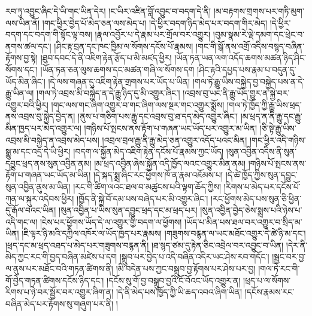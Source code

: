 རབ་ཏུ་འབྱུང་ཞིང་དེ་ཡི་གང་ཡིན་དེར། །ང་ཡིར་འཛིན་བློ་འབྱུང་བ་བདག་དེ་ནི། །མ་བརྟགས་གྲགས་པར་གཏི་མུག་ལས་ཡིན་ནོ། །གང་ཕྱིར་བྱེད་པོ་མེད་ཅན་ལས་མེད་པ། །དེ་ཕྱིར་བདག་ཉིད་མེད་པར་བདག་གིར་མེད། །དེ་ཕྱིར་བདག་དང་བདག་གི་སྟོང་ལྟ་བས། །རྣལ་འབྱོར་པ་དེ་རྣམ་པར་གྲོལ་བར་འགྱུར། །བུམ་སྣམ་རེ་ལྡེ་དམག་དང་ཕྲེང་བ་ནགས་ཚལ་དང་། །ཤིང་རྟ་བྲན་དང་ཁང་ཁྱིམ་ལ་སོགས་དངོས་པོ་རྣམས། །གང་གི་སྒོ་ནས་འགྲོ་འདིས་བསྙད་བཞིན་རྟོགས་བྱ་སྟེ། །ཐུབ་དབང་དེ་ནི་འཇིག་རྟེན་རྩོད་པ་མི་མཛད་ཕྱིར། །ཡོན་ཏན་ཡན་ལག་འདོད་ཆགས་མཚན་ཉིད་ཤིང་སོགས་དང་། །ཡོན་ཏན་ཅན་ལུས་ཆགས་དང་མཚན་གཞི་ལ་སོགས་དག །ཤིང་རྟའི་དཔྱད་པས་རྣམ་པ་བདུན་དུ་ཡོད་མིན་ཞིང་། །དེ་ལས་གཞན་དུ་འཇིག་རྟེན་གྲགས་པར་ཡོད་པ་ཡིན། །གལ་ཏེ་རྒྱུ་ཡིས་བསྐྱེད་བྱ་བསྐྱེད་པས་ན་དེ་རྒྱུ་ཡིན་ལ། །གལ་ཏེ་འབྲས་མི་བསྐྱེད་ན་དེ་རྒྱུ་ཉིད་དུ་མི་འགྱུར་ཞིང་། །འབྲས་བུ་ཡང་ནི་རྒྱུ་ཡོད་གྱུར་ན་སྐྱེ་བར་འགྱུར་བའི་ཕྱིར། །གང་ལས་གང་ཞིག་འགྱུར་བ་གང་ཞིག་ལས་སྔར་གང་འགྱུར་སྨྲོས། །གལ་ཏེ་ཁྱོད་ཀྱི་རྒྱུ་ཡིས་ཕྲད་ནས་འབྲས་བུ་སྐྱེད་བྱེད་ན། །ནུས་པ་གཅིག་པས་རྒྱུ་དང་འབྲས་བུ་ཐ་དད་མེད་འགྱུར་ཞིང་། །མ་ཕྲད་ན་ནི་རྒྱུ་དང་རྒྱུ་མིན་ཁྱད་པར་མེད་འགྱུར་ལ། །གཉིས་པོ་སྤངས་ནས་རྟོག་པ་གཞན་ཡང་ཡོད་པར་འགྱུར་མ་ཡིན། །ཅི་སྟེ་རྒྱུ་ཡིས་འབྲས་མི་བསྐྱེད་ན་འབྲས་མེད་པས། །འབྲལ་བྲལ་རྒྱུ་ནི་རྒྱུ་མེད་ཅན་འགྱུར་འདོད་པའང་མིན། །གང་ཕྱིར་འདི་གཉིས་སྒྱུ་མ་དང་འདྲ་དེ་ཡི་ཕྱིར། །བདག་ལ་སྐྱོན་མེད་འཇིག་རྟེན་དངོས་པོ་རྣམས་ཀྱང་ཡོད། །སུན་འབྱིན་འདིས་ནི་སུན་དབྱུང་ཕྲད་ནས་སུན་འབྱིན་ནམ། །མ་ཕྲད་འབྱིན་ཞེས་སྐྱོན་འདི་ཁྱོད་ལའང་འགྱུར་མིན་ནམ། །གཉིས་པོ་སྤངས་ནས་རྟོག་པ་གཞན་ཡང་ཡོད་མ་ཡིན། །དེ་སྐད་སྨྲ་ཞིང་རང་ཕྱོགས་ཁོ་ན་རྣམ་འཇོམས་པ། །དེ་ཚེ་ཁྱོད་ཀྱིས་སུན་དབྱུང་སུན་འབྱིན་ནུས་མ་ཡིན། །རང་གི་ཚིག་ལའང་ཐལ་བ་མཚུངས་པའི་ལྟག་ཆོད་ཀྱིས། །རིགས་པ་མེད་པར་དངོས་པོ་ཀུན་ལ་སྐུར་འདེབས་ཕྱིར། །ཁྱོད་ནི་སྐྱེ་བོ་དམ་པས་བཞེད་པར་མི་འགྱུར་ཞིང་། །རང་ཕྱོགས་མེད་པས་སུན་ཅི་ཕྱིན་དུ་རྒོལ་བའང་ཡིན། །སུན་འབྱིན་པ་ཡིས་སུན་དབྱུང་ཕྲད་དང་མ་ཕྲད་པར། །སུན་འབྱིན་བྱེད་ཅེས་སྨྲས་པའི་ཉེས་པ་འདི་གང་ལ། །ངེས་པར་ཕྱོགས་ཡོད་དེ་ལ་འགྱུར་གྱི་བདག་ལ་ཕྱོགས། །ཡོད་པ་མིན་པས་ཐལ་བར་འགྱུར་བ་སྲིད་མ་ཡིན། །ཇི་ལྟར་ཉི་མའི་དཀྱིལ་འཁོར་ལ་ཡོད་ཁྱད་པར་རྣམས། །གཟུགས་བརྙན་ལ་ཡང་མཐོང་འགྱུར་དེ་ཚེ་ཉི་མ་དང་། །ཕྲད་དང་མ་ཕྲད་འཐད་པ་མེད་པར་གཟུགས་བརྙན་ནི། །ཐ་སྙད་ཙམ་དུ་རྟེན་ཅིང་འབྲེལ་བར་འབྱུང་བ་ཡིན། །དེར་ནི་མེད་ཀྱང་རང་གི་བྱད་བཞིན་མཛེས་པ་དག །སྒྲུབ་པར་བྱེད་པ་འདི་བཞིན་འདིར་ཡང་ཤེས་རབ་གདོང་། །སྦྱང་བར་བྱ་ལ་ནུས་པར་མཐོང་བའི་གཏན་ཚིགས་ནི། །མི་བདེན་པས་ཀྱང་བསྒྲུབ་བྱ་རྟོགས་པར་ཤེས་པར་བྱ། །གལ་ཏེ་རང་གི་གོ་བྱེད་གཏན་ཚིགས་དངོས་ཉིད་དང་། །དངོས་སུ་གོ་བྱ་བསྒྲུབ་བྱའི་ངོ་བོའང་ཡོད་འགྱུར་ན། །ཕྲད་པ་ལ་སོགས་རིགས་པ་ཉེ་བར་སྦྱོར་བར་འགྱུར་ཞིག་ན། །དེ་ནི་མེད་པས་ཁྱོད་ཀྱི་ཡི་ཆད་འབའ་ཞིག་ཡིན། །དངོས་རྣམས་རང་བཞིན་མེད་པར་རྟོགས་སུ་གཞུག་པར་ནི། །
